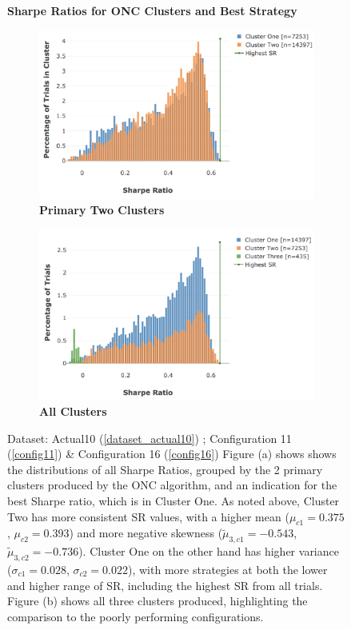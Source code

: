 \documentclass[a4paper,11pt,oneside]{article}
\theoremstyle{plain}
\theoremstyle{definition}
\begin{document}
		\begin{figure}[H]
		\centering
		\textbf{Sharpe Ratios for ONC Clusters and Best Strategy}
		\begin{subfigure}{.45\textwidth}
			\centering 
			\includegraphics[scale=0.4]{images/results/8_10_dsr/cluster_distributions_2.png} 
			\caption{\textbf{Primary Two Clusters}}
			\label{figure-dsr_clusters_3}
		\end{subfigure}%
		\begin{subfigure}{.5\textwidth}
			\includegraphics[scale=0.4]{images/results/8_10_dsr/cluster_distributions_3.png} 
			\caption{\textbf{All Clusters}}
			\label{figure-dsr_clusters_2}
		\end{subfigure}
		\caption[Sharpe Ratios for ONC Clusters and Best Strategy]{Dataset: Actual10 (\ref{dataset_actual10}) ; Configuration 11 (\ref{config11}) \&  Configuration 16 (\ref{config16})
			\newline Figure (a) shows shows the distributions of all Sharpe Ratios, grouped by the 2 primary clusters produced by the ONC algorithm, and an indication for the best Sharpe ratio, which is in Cluster One. As noted above, Cluster Two has more consistent SR values, with a higher mean ($\mu_{c1} = 0.375$, $\mu_{c2} = 0.393$) and more negative skewness ($\tilde{\mu}_{3,c1} = -0.543$, $\tilde{\mu}_{3,c2} = -0.736$). Cluster One on the other hand has higher variance ($\sigma_{c1} = 0.028$, $\sigma_{c2} = 0.022$), with more strategies at both the lower and higher range of SR, including the highest SR from all trials. Figure (b) shows all three clusters produced, highlighting the comparison to the poorly performing configurations.
		}
		\label{figure-dsr_clusters}
	\end{figure}
\end{document}
